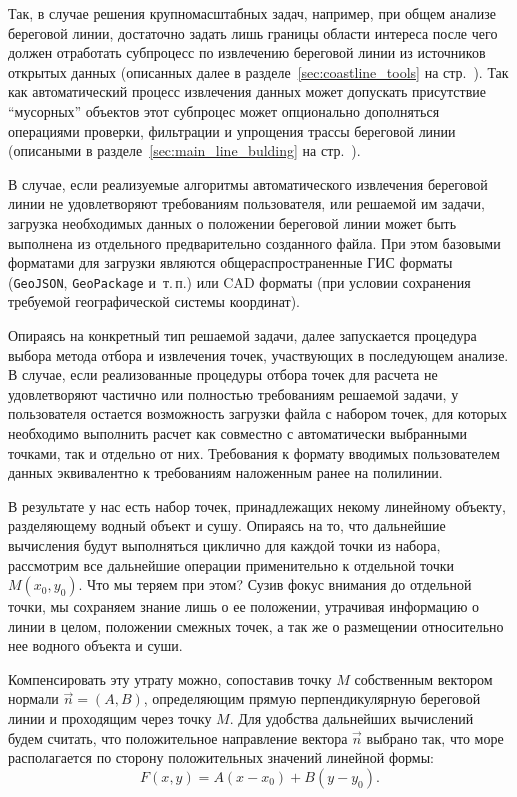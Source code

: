 Так, в случае решения крупномасштабных задач, например, при общем анализе береговой линии, достаточно задать лишь границы области интереса после чего должен отработать субпроцесс по извлечению береговой линии из источников открытых данных (описанных далее в разделе~\ref{sec:coastline_tools} на стр.~\pageref{sec:coastline_tools}).
Так как автоматический процесс извлечения данных может допускать присутствие \enquote{мусорных} объектов этот субпроцес может опционально дополняться операциями проверки, фильтрации и упрощения трассы береговой линии (описаными в разделе~\ref{sec:main_line_bulding} на стр.~\pageref{sec:main_line_bulding}).

В случае, если реализуемые алгоритмы автоматического извлечения береговой линии не удовлетворяют требованиям пользователя, или решаемой им задачи, загрузка необходимых данных о положении береговой линии может быть выполнена из отдельного предварительно созданного файла.
При этом базовыми форматами для загрузки являются общераспространенные ГИС форматы (\texttt{GeoJSON}, \texttt{GeoPackage} и~т.\,п.) или CAD форматы (при условии сохранения требуемой географической системы координат).

Опираясь на конкретный тип решаемой задачи, далее запускается процедура выбора метода отбора и извлечения точек, участвующих в последующем анализе.
В случае, если реализованные процедуры отбора точек для расчета не удовлетворяют частично или полностью требованиям решаемой задачи, у пользователя остается возможность загрузки файла с набором точек, для которых необходимо выполнить расчет как совместно с автоматически выбранными точками, так и отдельно от них.
Требования к формату вводимых пользователем данных эквивалентно к требованиям наложенным ранее на полилинии.

В результате у нас есть набор точек, принадлежащих некому линейному объекту, разделяющему водный объект и сушу.
Опираясь на то, что дальнейшие вычисления будут выполняться циклично для каждой точки из набора, рассмотрим все дальнейшие операции применительно к отдельной точки $M(x_0,y_0)$.
Что мы теряем при этом?
Сузив фокус внимания до отдельной точки, мы сохраняем знание лишь о ее положении, утрачивая информацию о линии в целом, положении смежных точек, а так же о размещении относительно нее водного объекта и суши.

Компенсировать эту утрату можно, сопоставив точку $M$ собственным вектором нормали $\vec{n}=(A,B)$, определяющим прямую перпендикулярную береговой линии и проходящим через точку $M$.
Для удобства дальнейших вычислений будем считать, что положительное направление вектора $\vec{n}$ выбрано так, что море располагается по сторону положительных значений линейной формы:
\begin{equation}\label{eq:norm_vect_line}
F(x,y) = A(x - x_0)+B(y - y_0).
\end{equation}

